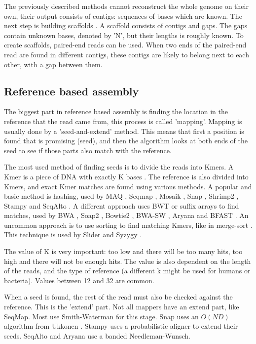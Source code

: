 \documentclass[../main/thesis.tex]{subfiles}
\begin{document}
The previously described methods cannot reconstruct the whole genome on their own, their output consists of contigs: sequences of bases which are known.
The next step is building scaffolds \cite{scaffold1}\cite{scaffold2}.
A scaffold consists of contigs and gaps.
The gaps contain unknown bases, denoted by 'N', but their lengths is roughly known.
To create scaffolds, paired-end reads can be used.
When two ends of the paired-end read are found in different contigs, these contigs are likely to belong next to each other, with a gap between them.


\subsection{Reference based assembly}
The biggest part in reference based assembly is finding the location in the reference that the read came from, this process is called 'mapping'.
Mapping is usually done by a 'seed-and-extend' method.
This means that first a position is found that is promising (seed), and then the algorithm looks at both ends of the seed to see if those parts also match with the reference.

The most used method of finding seeds is to divide the reads into Kmers.
A Kmer is a piece of DNA with exactly K bases \cite{Kmer}.
The reference is also divided into Kmers, and exact Kmer matches are found using various methods.
A popular and basic method is hashing, used by MAQ \cite{maq}, Seqmap \cite{seqmap}, Mosaik \cite{mosaik}, Snap \cite{snap}, Shrimp2 \cite{shrimp2}, Stampy \cite{stampy} and SeqAlto \cite{seqalto}.
A different approach uses BWT \cite{BWT} or suffix arrays \cite{SA} to find matches, used by BWA \cite{bwa}, Soap2 \cite{soap2}, Bowtie2 \cite{bowtie2}, BWA-SW \cite{bwa-sw}, Aryana \cite{aryana} and BFAST \cite{bfast}.
An uncommon approach is to use sorting to find matching Kmers, like in merge-sort \cite{mergesort}\cite{sorting}.
This technique is used by Slider \cite{slider} and Syzygy \cite{syzygy}.

The value of K is very important: too low and there will be too many hits, too high and there will not be enough hits.
The value is also dependent on the length of the reads, and the type of reference (a different k might be used for humans or bacteria).
Values between 12 and 32 are common.

When a seed is found, the rest of the read must also be checked against the reference.
This is the 'extend' part.
Not all mappers have an extend part, like SeqMap.
Most use Smith-Waterman for this stage.
Snap uses an $O(ND)$ algorithm from Ukkonen \cite{O_ND2}.
Stampy uses a probabilistic aligner to extend their seeds.
SeqAlto and Aryana use a banded Needleman-Wunsch.
\end{document}
